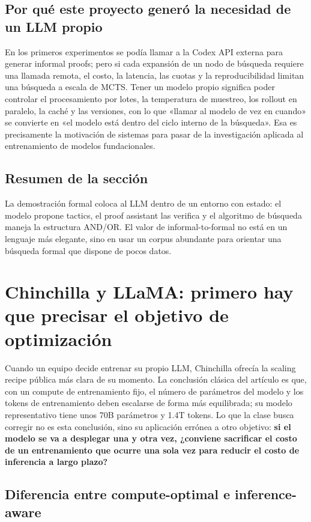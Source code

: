 \documentclass[a4paper]{article}
\begin{document}
\subsection{Por qué este proyecto generó la necesidad de un LLM propio}

En los primeros experimentos se podía llamar a la Codex API externa para generar informal proofs; pero si cada expansión de un nodo de búsqueda requiere una llamada remota, el costo, la latencia, las cuotas y la reproducibilidad limitan una búsqueda a escala de MCTS. Tener un modelo propio significa poder controlar el procesamiento por lotes, la temperatura de muestreo, los rollout en paralelo, la caché y las versiones, con lo que «llamar al modelo de vez en cuando» se convierte en «el modelo está dentro del ciclo interno de la búsqueda». Esa es precisamente la motivación de sistemas para pasar de la investigación aplicada al entrenamiento de modelos fundacionales.

\subsection{Resumen de la sección}

La demostración formal coloca al LLM dentro de un entorno con estado: el modelo propone tactics, el proof assistant las verifica y el algoritmo de búsqueda maneja la estructura AND/OR. El valor de informal-to-formal no está en un lenguaje más elegante, sino en usar un corpus abundante para orientar una búsqueda formal que dispone de pocos datos.

\section{Chinchilla y LLaMA: primero hay que precisar el objetivo de optimización}

Cuando un equipo decide entrenar su propio LLM, Chinchilla ofrecía la scaling recipe pública más clara de su momento. La conclusión clásica del artículo es que, con un compute de entrenamiento fijo, el número de parámetros del modelo y los tokens de entrenamiento deben escalarse de forma más equilibrada; su modelo representativo tiene unos 70B parámetros y 1.4T tokens. Lo que la clase busca corregir no es esta conclusión, sino su aplicación errónea a otro objetivo: \textbf{si el modelo se va a desplegar una y otra vez, ¿conviene sacrificar el costo de un entrenamiento que ocurre una sola vez para reducir el costo de inferencia a largo plazo?}

\subsection{Diferencia entre compute-optimal e inference-aware}
\end{document}
